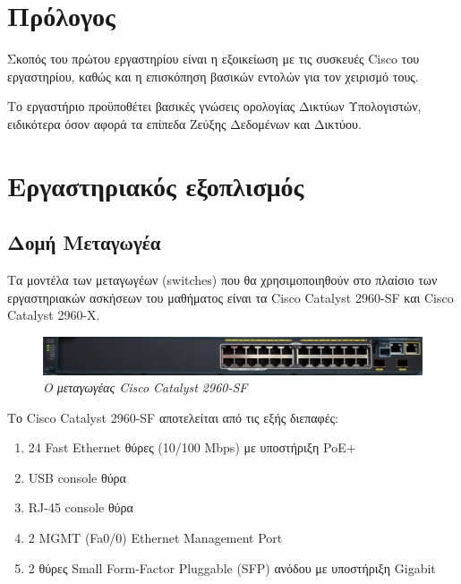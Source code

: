 \documentclass[12pt]{article}
\begin{document}
\section*{Πρόλογος}
Σκοπός του πρώτου εργαστηρίου είναι η εξοικείωση με τις συσκευές Cisco του εργαστηρίου, καθώς και η επισκόπηση βασικών εντολών για τον χειρισμό τους. \par
Το εργαστήριο προϋποθέτει βασικές γνώσεις ορολογίας Δικτύων Υπολογιστών, ειδικότερα όσον αφορά τα επίπεδα Ζεύξης Δεδομένων και Δικτύου.

\tableofcontents
\newpage

\section{Εργαστηριακός εξοπλισμός}

\subsection{Δομή Μεταγωγέα}
Τα μοντέλα των μεταγωγέων (switches) που θα χρησιμοποιηθούν στο πλαίσιο των εργαστηριακών ασκήσεων του μαθήματος είναι τα Cisco Catalyst 2960-SF και Cisco Catalyst 2960-X. 
\begin{figure}[H]
	\centering
	\includegraphics[scale=0.125]{c2960sf.jpg}
	\caption{\textit{Ο μεταγωγέας Cisco Catalyst 2960-SF}}
\end{figure}

Το Cisco Catalyst 2960-SF αποτελείται από τις εξής διεπαφές: 
\begin{enumerate}
	\setlength\itemsep{-0.1cm}
	\item 24 Fast Ethernet θύρες (10/100 Mbps) με υποστήριξη PoE+
	\item USB console θύρα
	\item RJ-45 console θύρα
	\item 2 MGMT (Fa0/0) Ethernet Management Port
	\item 2 θύρες Small Form-Factor Pluggable (SFP) ανόδου με υποστήριξη Gigabit
\end{enumerate}
\end{document}
